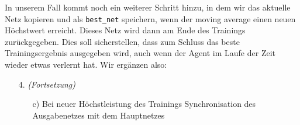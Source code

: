 In unserem Fall kommt noch ein weiterer Schritt hinzu, in dem wir das aktuelle Netz kopieren und als \texttt{best_net} speichern, wenn der moving average einen neuen Höchstwert erreicht. Dieses Netz wird dann am Ende des Trainings zurückgegeben. Dies soll sicherstellen, dass zum Schluss das beste Trainingsergebnis ausgegeben wird, auch wenn der Agent im Laufe der Zeit wieder etwas verlernt hat. Wir ergänzen also:
\begin{enumerate}
    \item[4.] \textit{(Fortsetzung)} 
    \begin{enumerate}
        \item[c)] Bei neuer Höchstleistung des Trainings Synchronisation des Ausgabenetzes mit dem Hauptnetzes
    \end{enumerate}
\end{enumerate}

